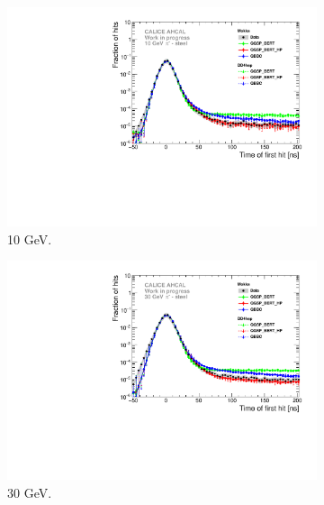 \begin{figure}[htbp!]
	\begin{subfigure}[t]{0.5\textwidth}
		\centering
		\includegraphics[width=1\textwidth]{../Thesis_Plots/Timing/Pions/Plots/Comparison_SimData_Pion10GeV_LateClusters.pdf}
		\caption{10 GeV.} \label{fig:dNdt_SimData_10GeV}
	\end{subfigure}
	\hfill
	\begin{subfigure}[t]{0.5\textwidth}
		\centering
		\includegraphics[width=1\textwidth]{../Thesis_Plots/Timing/Pions/Plots/Comparison_SimData_Pion30GeV_LateClusters.pdf}
		\caption{30 GeV.}\label{fig:dNdt_SimData_30GeV}
	\end{subfigure}
	\begin{subfigure}[t]{0.5\textwidth}
		\centering

\end{subfigure}
\end{figure}
